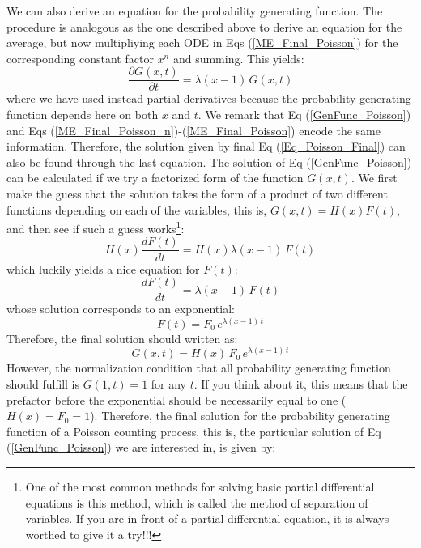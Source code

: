 \documentclass{article}
\begin{document}
We can also derive an equation for the probability generating function. The procedure is analogous as the one described above to derive an equation for the average, but now multipliying each ODE in Eqs (\ref{ME_Final_Poisson}) for the corresponding constant factor $x^n$ and summing. This yields:
\begin{equation}
    \frac{\partial G(x,t)}{\partial t} = \lambda(x-1)\,G(x,t)
    \label{GenFunc_Poisson}
\end{equation}
where we have used instead partial derivatives because the probability generating function depends here on both $x$ and $t$.  We remark that Eq (\ref{GenFunc_Poisson}) and Eqs (\ref{ME_Final_Poisson_n})-(\ref{ME_Final_Poisson}) encode the same information. Therefore, the solution given by final Eq (\ref{Eq_Poisson_Final}) can also be found through the last equation. The solution of Eq (\ref{GenFunc_Poisson}) can be calculated if we try a factorized form of the function $G(x,t)$. We first make the guess that the solution takes the form of a product of two different functions depending on each of the variables, this is, $G(x,t)=H(x)F(t)$, and then see if such a guess works\footnote{One of the most common methods for solving basic partial differential equations is this method, which is called the method of separation of variables. If you are in front of a partial differential equation, it is always worthed to give it a try!!!}:
\begin{equation}
    H(x) \frac{dF(t)}{dt} = H(x) \lambda(x-1)\,F(t)
\end{equation}
which luckily yields a nice equation for $F(t)$:
\begin{equation}
    \frac{dF(t)}{dt} = \lambda(x-1)\,F(t)
\end{equation}
whose solution corresponds to an exponential:
\begin{equation}
    F(t)= F_0\,e^{\lambda(x-1)\,t}
\end{equation}
Therefore, the final solution should written as:
\begin{equation}
    G(x, t)= H(x)\,F_0\,e^{\lambda(x-1)\,t}
\end{equation}
However, the normalization condition that all probability generating function should fulfill is $G(1,t)=1$ for any $t$. If you think about it, this means that the prefactor before the exponential should be necessarily equal to one ($H(x)=F_0=1$). Therefore, the final solution for the probability generating function of a Poisson counting process, this is, the particular solution of Eq (\ref{GenFunc_Poisson}) we are interested in, is given by: 
\end{document}
